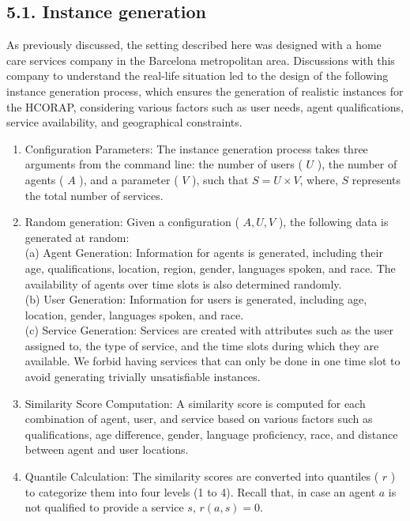 \documentclass[10pt]{article}
\begin{document}
\subsection*{5.1. Instance generation}
As previously discussed, the setting described here was designed with a home care services company in the Barcelona metropolitan area. Discussions with this company to understand the real-life situation led to the design of the following instance generation process, which ensures the generation of realistic instances for the HCORAP, considering various factors such as user needs, agent qualifications, service availability, and geographical constraints.

\begin{enumerate}
  \item Configuration Parameters: The instance generation process takes three arguments from the command line: the number of users ( $U$ ), the number of agents ( $A$ ), and a parameter ( $V$ ), such that $S=U \times V$, where, $S$ represents the total number of services.
  \item Random generation: Given a configuration ( $A, U, V$ ), the following data is generated at random:\\
(a) Agent Generation: Information for agents is generated, including their age, qualifications, location, region, gender, languages spoken, and race. The availability of agents over time slots is also determined randomly.\\
(b) User Generation: Information for users is generated, including age, location, gender, languages spoken, and race.\\
(c) Service Generation: Services are created with attributes such as the user assigned to, the type of service, and the time slots during which they are available. We forbid having services that can only be done in one time slot to avoid generating trivially unsatisfiable instances.
  \item Similarity Score Computation: A similarity score is computed for each combination of agent, user, and service based on various factors such as qualifications, age difference, gender, language proficiency, race, and distance between agent and user locations.
  \item Quantile Calculation: The similarity scores are converted into quantiles ( $r$ ) to categorize them into four levels (1 to 4). Recall that, in case an agent $a$ is not qualified to provide a service $s$, $r(a, s)=0$.
\end{enumerate}
\end{document}
